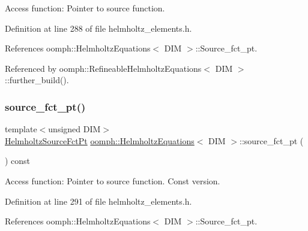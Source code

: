 Access function\+: Pointer to source function. 



Definition at line 288 of file helmholtz\+\_\+elements.\+h.



References oomph\+::\+Helmholtz\+Equations$<$ D\+I\+M $>$\+::\+Source\+\_\+fct\+\_\+pt.



Referenced by oomph\+::\+Refineable\+Helmholtz\+Equations$<$ D\+I\+M $>$\+::further\+\_\+build().

\mbox{\label{classoomph_1_1HelmholtzEquations_af8127c995ddc0b8dbc29ed413f2eb7b2}} 
\subsubsection{\texorpdfstring{source\+\_\+fct\+\_\+pt()}{source\_fct\_pt()}\hspace{0.1cm}{\footnotesize\ttfamily [2/2]}}
{\footnotesize\ttfamily template$<$unsigned D\+IM$>$ \\
\hyperlink{classoomph_1_1HelmholtzEquations_a630648023d91bba9ee9a900353a1ea58}{Helmholtz\+Source\+Fct\+Pt} \hyperlink{classoomph_1_1HelmholtzEquations}{oomph\+::\+Helmholtz\+Equations}$<$ D\+IM $>$\+::source\+\_\+fct\+\_\+pt (\begin{DoxyParamCaption}{ }\end{DoxyParamCaption}) const\hspace{0.3cm}{\ttfamily [inline]}}



Access function\+: Pointer to source function. Const version. 



Definition at line 291 of file helmholtz\+\_\+elements.\+h.



References oomph\+::\+Helmholtz\+Equations$<$ D\+I\+M $>$\+::\+Source\+\_\+fct\+\_\+pt.

\mbox{\label{classoomph_1_1HelmholtzEquations_a2c2e01a3fb0a4c30ec99aad2d080abaf}} 
